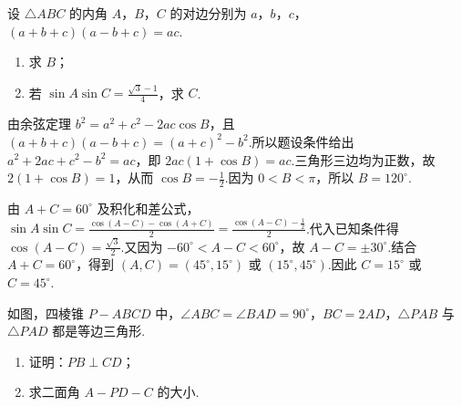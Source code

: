 \begin{problem}
设 \(\triangle ABC\) 的内角 \(A\)，\(B\)，\(C\) 的对边分别为 \(a\)，\(b\)，\(c\)，\((a+b+c)(a-b+c)=ac\).

\begin{enumerate}
\item 求 \(B\)；
\item 若 \(\sin A\sin C=\frac{\sqrt{3}-1}{4}\)，求 \(C\).
\end{enumerate}
\end{problem}

\begin{solution}
由余弦定理 \(b^2=a^2+c^2-2ac\cos B\)，且 \((a+b+c)(a-b+c)=(a+c)^2-b^2\).所以题设条件给出 \(a^2+2ac+c^2-b^2=ac\)，即 \(2ac(1+\cos B)=ac\).三角形三边均为正数，故 \(2(1+\cos B)=1\)，从而 \(\cos B=-\frac{1}{2}\).因为 \(0<B<\pi\)，所以 \(B=120^{\circ}\).

由 \(A+C=60^{\circ}\) 及积化和差公式，\(\sin A\sin C=\frac{\cos(A-C)-\cos(A+C)}{2}=\frac{\cos(A-C)-\frac{1}{2}}{2}\).代入已知条件得 \(\cos(A-C)=\frac{\sqrt3}{2}\).又因为 \(-60^{\circ}<A-C<60^{\circ}\)，故 \(A-C=\pm30^{\circ}\).结合 \(A+C=60^{\circ}\)，得到 \((A,C)=(45^{\circ},15^{\circ})\) 或 \((15^{\circ},45^{\circ})\).因此 \(C=15^{\circ}\) 或 \(C=45^{\circ}\).
\end{solution}

\begin{problem}
如图，四棱锥 \(P-ABCD\) 中，\(\angle ABC=\angle BAD=90^{\circ}\)，\(BC=2AD\)，\(\triangle PAB\) 与 \(\triangle PAD\) 都是等边三角形.

\begin{enumerate}
\item 证明：\(PB\perp CD\)；
\item 求二面角 \(A-PD-C\) 的大小.
\end{enumerate}

\end{problem}

